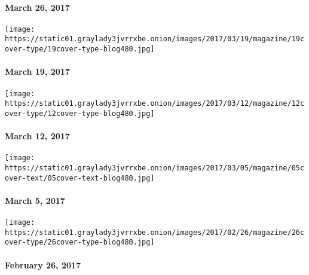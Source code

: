 \hypertarget{march-26-2017}{%
\paragraph{March 26, 2017}\label{march-26-2017}}

\href{https://www.nytimes3xbfgragh.onion/issue/magazine/2017/03/17/31917-20170319}{}

\texttt{[image: https://static01.graylady3jvrrxbe.onion/images/2017/03/19/magazine/19cover-type/19cover-type-blog480.jpg]}

\hypertarget{march-19-2017}{%
\paragraph{March 19, 2017}\label{march-19-2017}}

\href{https://www.nytimes3xbfgragh.onion/interactive/2017/03/09/magazine/25-songs-that-tell-us-where-music-is-going.html}{}

\texttt{[image: https://static01.graylady3jvrrxbe.onion/images/2017/03/12/magazine/12cover-type/12cover-type-blog480.jpg]}

\hypertarget{march-12-2017}{%
\paragraph{March 12, 2017}\label{march-12-2017}}

\href{https://www.nytimes3xbfgragh.onion/issue/magazine/2017/03/03/magazine-index-20170305}{}

\texttt{[image: https://static01.graylady3jvrrxbe.onion/images/2017/03/05/magazine/05cover-text/05cover-text-blog480.jpg]}

\hypertarget{march-5-2017}{%
\paragraph{March 5, 2017}\label{march-5-2017}}

\href{https://www.nytimes3xbfgragh.onion/issue/magazine/2017/02/24/magazine-index-20170226}{}

\texttt{[image: https://static01.graylady3jvrrxbe.onion/images/2017/02/26/magazine/26cover-type/26cover-type-blog480.jpg]}

\hypertarget{february-26-2017}{%
\paragraph{February 26, 2017}\label{february-26-2017}}

